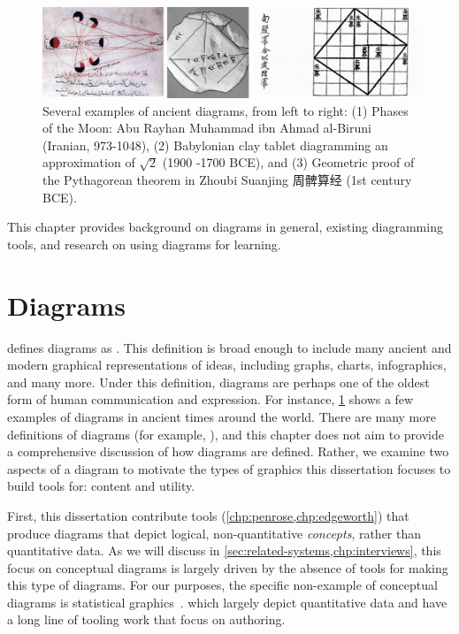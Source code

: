 \begin{figure}[h]
    \centering
    \includegraphics[width=\linewidth]{assets/related-work/historical-diagrams.pdf}
    \caption{Several examples of ancient diagrams, from left to right: (1) Phases of the Moon: Abu Rayhan Muhammad ibn Ahmad al-Biruni (Iranian, 973-1048), (2) Babylonian clay tablet diagramming an approximation of $\sqrt{2}$ (1900 -1700 BCE), and (3) Geometric proof of the Pythagorean theorem in Zhoubi Suanjing 周髀算经 (1st century BCE).}
    \label{fig:ancient-diagrams}
\end{figure}

This chapter provides background on diagrams in general, existing diagramming tools, and research on using diagrams for learning.

\section{Diagrams}
\label{sec:diagrams}

\citet{tversky_diagrams_2017,tversky_visualizing_2011} defines diagrams as . This definition is broad enough to include many ancient and modern graphical representations of ideas, including graphs, charts, infographics, and many more. Under this definition, diagrams are perhaps one of the oldest form of human communication and expression. For instance, \cref{fig:ancient-diagrams} shows a few examples of diagrams in ancient times around the world. There are many more definitions of diagrams (for example, \cite{bender_culture_2010,card_readings_1999,infographics,arnheim_visual_1969,tufte1983visual}), and this chapter does not aim to provide a comprehensive discussion of how diagrams are defined. Rather, we examine two aspects of a diagram to motivate the types of graphics this dissertation focuses to build tools for: content and utility.

First, this dissertation contribute tools (\cref{chp:penrose,chp:edgeworth}) that produce diagrams that depict logical, non-quantitative \textit{concepts}, rather than quantitative data. As we will discuss in \cref{sec:related-systems,chp:interviews}, this focus on conceptual diagrams is largely driven by the absence of tools for making this type of diagrams. For our purposes, the specific non-example of conceptual diagrams is statistical graphics~\cite{wilkinson_grammar_2012}. which largely depict quantitative data and have a long line of tooling work that focus on authoring. 

